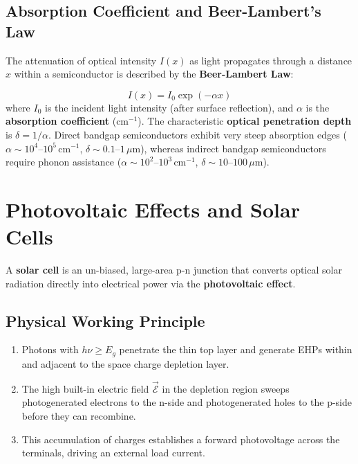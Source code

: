 \documentclass[12pt,a4paper]{article}
\begin{document}
\subsection{Absorption Coefficient and Beer-Lambert's Law}
The attenuation of optical intensity $I(x)$ as light propagates through a distance $x$ within a semiconductor is described by the \textbf{Beer-Lambert Law}:

\begin{tcolorbox}[formulabox, title={\textbf{Beer-Lambert Absorption Law}}]
\begin{equation}
  I(x) = I_0 \exp(-\alpha x)
\end{equation}
where $I_0$ is the incident light intensity (after surface reflection), and $\alpha$ is the \textbf{absorption coefficient} ($\text{cm}^{-1}$). The characteristic \textbf{optical penetration depth} is $\delta = 1/\alpha$. Direct bandgap semiconductors exhibit very steep absorption edges ($\alpha \sim 10^4\text{--}10^5\,\text{cm}^{-1}$, $\delta \sim 0.1\text{--}1\,\mu\text{m}$), whereas indirect bandgap semiconductors require phonon assistance ($\alpha \sim 10^2\text{--}10^3\,\text{cm}^{-1}$, $\delta \sim 10\text{--}100\,\mu\text{m}$).
\end{tcolorbox}

\section{Photovoltaic Effects and Solar Cells}

A \textbf{solar cell} is an un-biased, large-area p-n junction that converts optical solar radiation directly into electrical power via the \textbf{photovoltaic effect}.

\subsection{Physical Working Principle}
\begin{enumerate}[label=\arabic*., leftmargin=*]
  \item Photons with $h\nu \ge E_g$ penetrate the thin top layer and generate EHPs within and adjacent to the space charge depletion layer.
  \item The high built-in electric field $\vec{\mathcal{E}}$ in the depletion region sweeps photogenerated electrons to the n-side and photogenerated holes to the p-side before they can recombine.
  \item This accumulation of charges establishes a forward photovoltage across the terminals, driving an external load current.
\end{enumerate}
\end{document}
